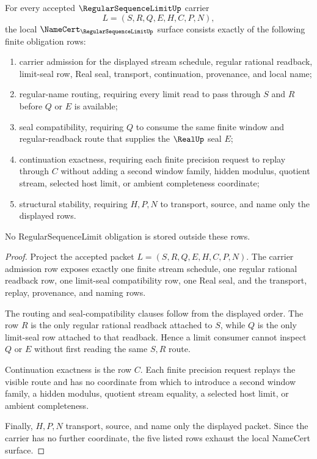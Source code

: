 \begin{theorem}
\label{thm:regular-sequence-limit-namecert-obligations}
For every accepted $\RegularSequenceLimitUp$ carrier
$$
L=(S,R,Q,E,H,C,P,N),
$$
the local $\NameCert_{\RegularSequenceLimitUp}$ surface consists exactly of the following finite obligation rows:
\begin{enumerate}
\item carrier admission for the displayed stream schedule, regular rational readback, limit-seal row, Real seal, transport, continuation, provenance, and local name;
\item regular-name routing, requiring every limit read to pass through $S$ and $R$ before $Q$ or $E$ is available;
\item seal compatibility, requiring $Q$ to consume the same finite window and regular-readback route that supplies the $\RealUp$ seal $E$;
\item continuation exactness, requiring each finite precision request to replay through $C$ without adding a second window family, hidden modulus, quotient stream, selected host limit, or ambient completeness coordinate;
\item structural stability, requiring $H,P,N$ to transport, source, and name only the displayed rows.
\end{enumerate}
No RegularSequenceLimit obligation is stored outside these rows.
\end{theorem}
\begin{proof}
Project the accepted packet $L=(S,R,Q,E,H,C,P,N)$. The carrier admission row exposes exactly one finite stream schedule, one regular rational readback row, one limit-seal compatibility row, one Real seal, and the transport, replay, provenance, and naming rows.

The routing and seal-compatibility clauses follow from the displayed order. The row $R$ is the only regular rational readback attached to $S$, while $Q$ is the only limit-seal row attached to that readback. Hence a limit consumer cannot inspect $Q$ or $E$ without first reading the same $S,R$ route.

Continuation exactness is the row $C$. Each finite precision request replays the visible route and has no coordinate from which to introduce a second window family, a hidden modulus, quotient stream equality, a selected host limit, or ambient completeness.

Finally, $H,P,N$ transport, source, and name only the displayed packet. Since the carrier has no further coordinate, the five listed rows exhaust the local NameCert surface.
\end{proof}

